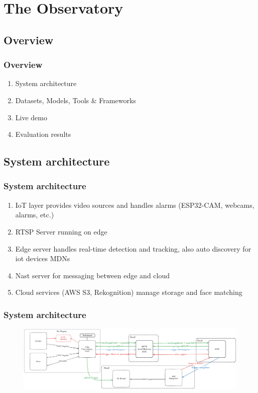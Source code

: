 \documentclass[11pt,t,usepdftitle=false,aspectratio=169]{beamer}
\begin{document}
\section{The Observatory}

\subsection{Overview}

\begin{frame}
	\frametitle{Overview}


	\bigskip
	\begin{enumerate}
		\item {System architecture}
		\item {Datasets, Models, Tools \& Frameworks}
		\item {Live demo}
		\item {Evaluation results}
	\end{enumerate}

\end{frame}

\subsection{System architecture}

\begin{frame}
	\frametitle{System architecture}
	\begin{enumerate}
		\item IoT layer provides video sources and handles alarms (ESP32-CAM, webcams, alarms, etc.)
		\item RTSP Server running on edge
		\item Edge server handles real-time detection and tracking, also auto discovery for iot devices MDNs
		\item Nast server for messaging between edge and cloud
		\item Cloud services (AWS S3, Rekognition) manage storage and face matching
	\end{enumerate}
\end{frame}

\begin{frame}
	\frametitle{System architecture}
	\vspace{1cm}
	\begin{figure}
		\centering
		\includegraphics{_images/Distributed_Systems_Architecture_V2.png}
	\end{figure}
\end{frame}
\end{document}
